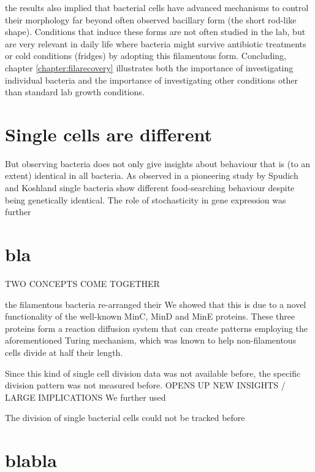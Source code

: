 the results also implied that bacterial cells have advanced mechanisms to control their morphology far beyond often observed bacillary form (the short rod-like shape).
%
Conditions that induce these forms are not often studied in the lab, 
but are very relevant in daily life where bacteria might survive antibiotic treatments or cold conditions (fridges) by adopting this filamentous form.
%
Concluding, chapter \ref{chapter:filarecovery} illustrates both the importance of investigating individual bacteria and the importance of investigating other conditions other than standard lab growth conditions. 

\section{Single cells are different} 

But observing bacteria does not only give insights about behaviour that is (to an extent) identical in all bacteria.
%
As observed in a pioneering study by Spudich and Koshland \cite{Spudich1976} single bacteria show different food-searching behaviour despite being genetically identical.
%
The role of stochasticity in gene expression was further 

\section{bla}

TWO CONCEPTS COME TOGETHER

the filamentous bacteria re-arranged their 
%
We showed that this is due to a novel functionality of the well-known MinC, MinD and MinE proteins.
These three proteins form a reaction diffusion system that can create patterns employing the aforementioned Turing mechanism, 
which was known to help non-filamentous cells divide at half their length. 
%

%
Since this kind of single cell division data was not available before, the specific division pattern was not measured before.
OPENS UP NEW INSIGHTS / LARGE IMPLICATIONS
%
We further used 



The division of single bacterial cells could not be tracked before 



\section{blabla}

